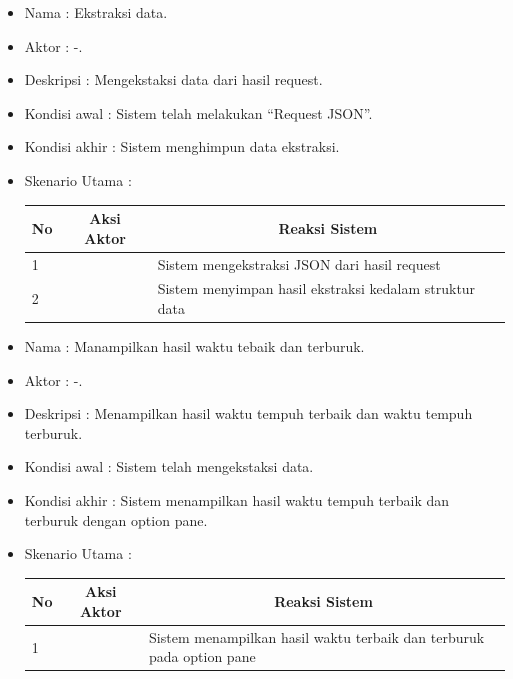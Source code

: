 \begin{enumerate}
		\begin{itemize}
		\item Nama : Ekstraksi data.
		\item Aktor : -.
		\item Deskripsi : Mengekstaksi data dari hasil request.
		\item Kondisi awal : Sistem telah melakukan "`Request JSON"'. 
		\item Kondisi akhir : Sistem menghimpun data ekstraksi. 
		\item Skenario Utama : \\
\begin{table}[H]
\centering
\begin{tabular}{|p{1cm}|p{4cm}|p{4cm}|}
\hline
\multicolumn{1}{|c|}{\textbf{No}} & \multicolumn{1}{c|}{\textbf{Aksi Aktor}}    & \multicolumn{1}{c|}{\textbf{Reaksi Sistem}}                             \\ \hline
1                                 &                        & Sistem mengekstraksi JSON dari hasil request                             \\ \hline
2                                 & &Sistem menyimpan hasil ekstraksi kedalam struktur data\\ \hline
\end{tabular}
\end{table}
	\end{itemize}	


	\begin{itemize}
		\item Nama : Manampilkan hasil waktu tebaik dan terburuk.
		\item Aktor : -.
		\item Deskripsi : Menampilkan hasil waktu tempuh terbaik dan waktu tempuh terburuk.
		\item Kondisi awal : Sistem telah mengekstaksi data. 
		\item Kondisi akhir : Sistem menampilkan hasil waktu tempuh terbaik dan terburuk dengan option pane. 
		\item Skenario Utama : \\
\begin{table}[H]
\centering
\begin{tabular}{|p{1cm}|p{4cm}|p{4cm}|}
\hline
\multicolumn{1}{|c|}{\textbf{No}} & \multicolumn{1}{c|}{\textbf{Aksi Aktor}}    & \multicolumn{1}{c|}{\textbf{Reaksi Sistem}}                             \\ \hline
1                                 &                        & Sistem menampilkan hasil waktu terbaik dan terburuk pada option pane                             \\ \hline
\end{tabular}
\end{table}
\end{itemize}	



\end{enumerate}
